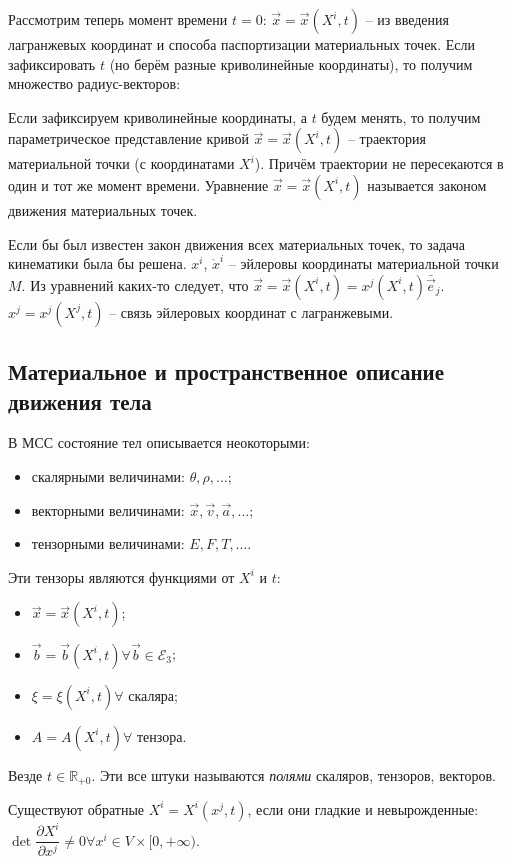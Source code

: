 Рассмотрим теперь момент времени $t = 0$: $\vec{x} = \vec{x}(X^i, t)$ -- из введения лагранжевых 
координат и способа паспортизации материальных точек. Если зафиксировать $t$ (но берём разные
криволинейные координаты), то получим множество радиус-векторов:

Если зафиксируем криволинейные координаты, а $t$ будем менять, то получим параметрическое
представление кривой $\vec{x} = \vec{x} ( X^i, t )$ -- траектория материальной точки (с координатами
$X^i$). Причём траектории не пересекаются в один и тот же момент времени. Уравнение $\vec{x} = \vec{x}(X^i, t)$ называется законом движения материальных точек.

Если бы был известен закон движения всех материальных точек, то задача кинематики была бы решена.
$x^{i}$, $\mathring{x}^i$ -- эйлеровы координаты материальной точки $M$. Из уравнений каких-то
следует, что $\vec{x} = \vec{x} (X^i, t) = x^j ( X^i, t) \bar{\vec{e}}_j$. $x^j = x^j(X^j, t)$
-- связь эйлеровых координат с лагранжевыми.

\subsection{Материальное и пространственное описание движения тела}

В МСС состояние тел описывается неокоторыми:
\begin{itemize}
  \item скалярными величинами: $\theta, \rho, \dots$;
  \item векторными величинами: $\vec{x}, \vec{v}, \vec{a}, \dots$;
  \item тензорными величинами: $E, F, T, \dots$.
\end{itemize}

Эти тензоры являются функциями от $X^i$ и $t$:
\begin{itemize}
  \item $\vec{x} = \vec{x} (X^i, t)$;
  \item $\vec{b} = \vec{b} (X^i, t) \forall \vec{b} \in \mathcal{E}_3$;
  \item $\xi = \xi(X^i, t) \forall $ скаляра;
  \item $A = A(X^i, t) \forall$ тензора.
\end{itemize}
Везде $t \in \mathbb{R}_{+0}$. Эти все штуки называются \emph{полями} скаляров, тензоров, векторов.

Существуют обратные $X^i = X^i ( x^j, t )$, если они гладкие и невырожденные: $\det \dfrac{\partial X^i}{\partial x^j} \neq 0 \forall x^i \in V \times [0, +\infty)$.

